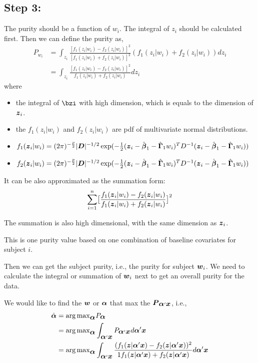 \documentclass[12pt]{article}
\begin{document}
\subsection{Step 3:}

The purity should be a function of $w_i$. The integral of $z_i$ should be calculated first. Then we can define the purity as,
$$\begin{aligned}
P_{w_i} & = \int_{z_i} \frac{[f_1(z_i|w_i) - f_2(z_i|w_i)]^2}{[f_1(z_i|w_i) + f_2(z_i|w_i)]^2} (f_1(z_i|w_i) + f_2(z_i|w_i)) dz_i \\
& = \int_{z_i} \frac{[f_1(z_i|w_i) - f_2(z_i|w_i)]^2}{f_1(z_i|w_i) + f_2(z_i|w_i)} dz_i
\end{aligned}$$
where
\begin{itemize}
    \item the integral of $\bzi$ with high dimension, which is equals to the dimension of $\mbox{\boldmath $z$}_i$.
    \item the $f_1(z_i|w_i)$ and $f_2(z_i|w_i)$ are pdf of multivariate normal distributions. 
    \item $f_1(\mbox{\boldmath $z$}_i|w_i) = (2\pi)^{-\frac{p}{2}} |\mbox{\boldmath $D$}|^{-1/2}\exp(-\frac{1}{2} ( \mbox{\boldmath $z$}_i - \hat{\mbox{\boldmath $\beta$}}_1 - \hat{\mbox{\boldmath $\Gamma$}}_1 w_i)^{T} D^{-1} (\mbox{\boldmath $z$}_i - \hat{\mbox{\boldmath $\beta$}}_1  - \hat{\mbox{\boldmath $\Gamma$}}_1 w_i) )$
    \item $f_2(\mbox{\boldmath $z$}_i|w_i) = (2\pi)^{-\frac{p}{2}} |\mbox{\boldmath $D$}|^{-1/2} \exp(-\frac{1}{2} ( \mbox{\boldmath $z$}_i - \hat{\mbox{\boldmath $\beta$}}_1 - \hat{\mbox{\boldmath $\Gamma$}}_1 w_i)^{T} D^{-1} (\mbox{\boldmath $z$}_i - \hat{\mbox{\boldmath $\beta$}}_1  - \hat{\mbox{\boldmath $\Gamma$}}_1 w_i) )$
\end{itemize}

It can be also approximated as the summation form: 
$$\sum_{i=1}^n \bigl[ { f_1(\mbox{\boldmath $z$}_i|w_i) -  f_2(\mbox{\boldmath $z$}_i|w_i) \over  f_1(\mbox{\boldmath $z$}_i|w_i) +  f_2(\mbox{\boldmath $z$}_i|w_i)} \bigr]^2 $$

The summation is also high dimensional, with the same dimension as $\mbox{\boldmath $z$}_i$. 

This is one purity value based on one combination of baseline covariates for subject $i$.

Then we can get the subject purity, i.e., the purity for subject $\mbox{\boldmath $w$}_i$. We need to calculate the integral or summation of $\mbox{\boldmath $w$}_i$ next to get an overall purity for the data. 

We would like to find the $\mbox{\boldmath $w$}$ or $\mbox{\boldmath $\alpha$}$ that max the $\mbox{\boldmath $P$}_{\mbox{\boldmath $\alpha$}'\mbox{\boldmath $x$}}$, i.e.,
 $$\begin{aligned}
 \hat{\mbox{\boldmath $\alpha$}} &= {\arg \max}_{\mbox{\boldmath $\alpha$}} P_{\mbox{\boldmath $\alpha$}} \\
  & = {\arg \max}_{\mbox{\boldmath $\alpha$}}
 \int_{\mbox{\boldmath $\alpha$}'\mbox{\boldmath $x$}} P_{\mbox{\boldmath $\alpha$}'\mbox{\boldmath $x$}} d \mbox{\boldmath $\alpha$}'\mbox{\boldmath $x$}\\
  & = 
 {\arg \max}_{\mbox{\boldmath $\alpha$}}
 \int_{\mbox{\boldmath $\alpha$}'\mbox{\boldmath $x$}} {  {( f_1(\mbox{\boldmath $z$}|\mbox{\boldmath $\alpha$}'\mbox{\boldmath $x$}) -  f_2(\mbox{\boldmath $z$}|\mbox{\boldmath $\alpha$}'\mbox{\boldmath $x$}))^2 \over 1 f_1(\mbox{\boldmath $z$}|\mbox{\boldmath $\alpha$}'\mbox{\boldmath $x$}) +  f_2(\mbox{\boldmath $z$}|\mbox{\boldmath $\alpha$}'\mbox{\boldmath $x$})}   d \mbox{\boldmath $\alpha$}'\mbox{\boldmath $x$}} 
 \end{aligned}$$



\end{document}
